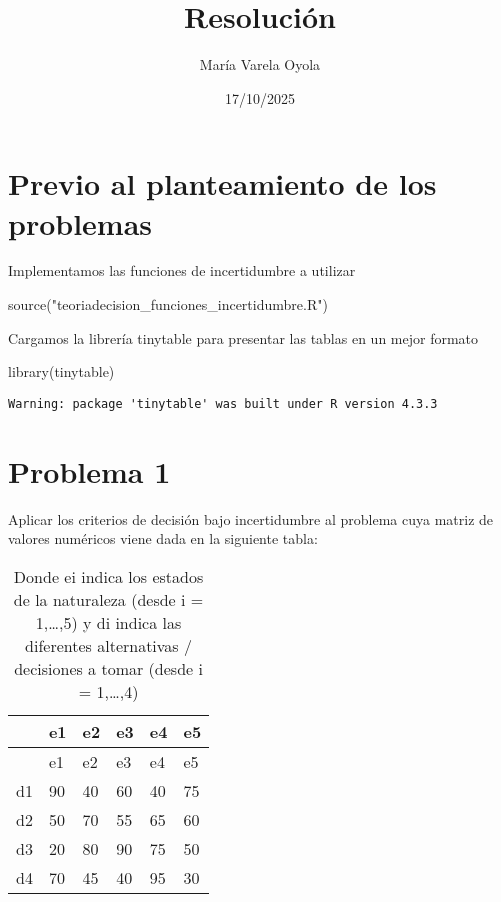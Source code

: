\documentclass[
  letterpaper,
  DIV=11,
  numbers=noendperiod]{scrartcl}
\title{Resolución}
\author{María Varela Oyola}
\date{17/10/2025}
\newenvironment{Shaded}{\begin{snugshade}}{\end{snugshade}}
\newcommand{\FunctionTok}[1]{\textcolor[rgb]{0.28,0.35,0.67}{#1}}
\newcommand{\NormalTok}[1]{\textcolor[rgb]{0.00,0.23,0.31}{#1}}
\newcommand{\StringTok}[1]{\textcolor[rgb]{0.13,0.47,0.30}{#1}}
\renewcommand*\contentsname{Tabla de contenidos}
\newcommand\contentsname{Tabla de contenidos}
\begin{document}
\maketitle

\renewcommand*\contentsname{Tabla de contenidos}
{
\hypersetup{linkcolor=}
\setcounter{tocdepth}{4}
\tableofcontents
}
\pagebreak

\section{Previo al planteamiento de los
problemas}\label{previo-al-planteamiento-de-los-problemas}

Implementamos las funciones de incertidumbre a utilizar

\begin{Shaded}
\begin{Highlighting}[]
\FunctionTok{source}\NormalTok{(}\StringTok{"teoriadecision\_funciones\_incertidumbre.R"}\NormalTok{)}
\end{Highlighting}
\end{Shaded}

Cargamos la librería tinytable para presentar las tablas en un mejor
formato

\begin{Shaded}
\begin{Highlighting}[]
\FunctionTok{library}\NormalTok{(tinytable)}
\end{Highlighting}
\end{Shaded}

\begin{verbatim}
Warning: package 'tinytable' was built under R version 4.3.3
\end{verbatim}

\pagebreak

\section{Problema 1}\label{problema-1}

Aplicar los criterios de decisión bajo incertidumbre al problema cuya
matriz de valores numéricos viene dada en la siguiente tabla:

\begin{longtable}[]{@{}llllll@{}}
\caption{Donde ei indica los estados de la naturaleza (desde i =
1,\ldots,5) y di indica las diferentes alternativas / decisiones a tomar
(desde i = 1,\ldots,4)}\tabularnewline
\toprule\noalign{}
& e1 & e2 & e3 & e4 & e5 \\
\midrule\noalign{}
\endfirsthead
\toprule\noalign{}
& e1 & e2 & e3 & e4 & e5 \\
\midrule\noalign{}
\endhead
\bottomrule\noalign{}
\endlastfoot
d1 & 90 & 40 & 60 & 40 & 75 \\
d2 & 50 & 70 & 55 & 65 & 60 \\
d3 & 20 & 80 & 90 & 75 & 50 \\
d4 & 70 & 45 & 40 & 95 & 30 \\
\end{longtable}
\end{document}
